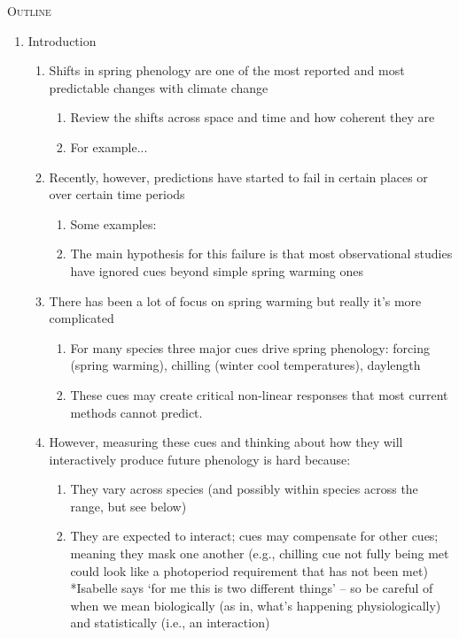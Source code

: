 \documentclass[11pt,letterpaper]{article}
\renewcommand{\section}[1]{%
\bigskip
\begin{center}
\begin{Large}
\normalfont\scshape #1
\medskip
\end{Large}
\end{center}}
\begin{document}
\section{Outline}
\begin{enumerate}
\item Introduction 
\begin{enumerate}
\item Shifts in spring phenology are one of the most reported and most predictable changes with climate change
\begin{enumerate}
\item Review the shifts across space and time and how coherent they are
\item For example... \citet{Schwartz:1997nn,Menzel2003a,Menzel:2006sq,delpierre2009,Ellwood2012,jochner2013,hereford2017}
\end{enumerate}
\item Recently, however, predictions have started to fail in certain places or over certain time periods
\begin{enumerate}
\item Some examples: \citet{yu2010,fu2015} 
\item The main hypothesis for this failure is that  most observational studies have ignored cues beyond simple spring warming ones \citep{chuine2016}
\end{enumerate}
\item There has been a lot of focus on spring warming but really it's more complicated
\begin{enumerate}
\item For many species three major cues drive spring phenology: forcing (spring warming), chilling (winter cool temperatures), daylength
\item These cues may create critical non-linear responses that most current methods cannot predict.
\end{enumerate}
\item However, measuring these cues and thinking about how they will interactively produce future phenology is hard because:
\begin{enumerate}
\item They vary across species (and possibly within species across the range, but see below) \citep{vitasse2009,harrington2015} 
\item They are expected to interact; cues may compensate for other cues; meaning they mask one another (e.g., chilling cue not fully being met could look like a photoperiod requirement that has not been met) *Isabelle says `for me this is two different things' -- so be careful of when we mean biologically (as in, what's happening physiologically) and statistically (i.e., an interaction)

\end{enumerate}
\end{enumerate}
\end{enumerate}
\end{document}
